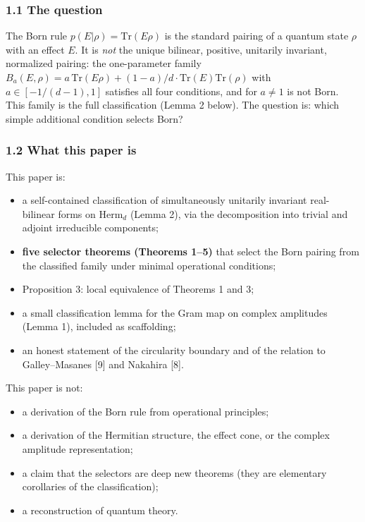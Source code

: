 \documentclass[
]{article}
\providecommand{\tightlist}{%
  \setlength{\itemsep}{0pt}\setlength{\parskip}{0pt}}
\begin{document}
\subsubsection{1.1 The question}\label{the-question}

The Born rule \(p(E|\rho)=\mathrm{Tr}(E\rho)\) is the standard pairing
of a quantum state \(\rho\) with an effect \(E\). It is \emph{not} the
unique bilinear, positive, unitarily invariant, normalized pairing: the
one-parameter family
\(B_a(E,\rho)=a\,\mathrm{Tr}(E\rho)+(1-a)/d\cdot\mathrm{Tr}(E)\mathrm{Tr}(\rho)\)
with \(a\in[-1/(d-1),1]\) satisfies all four conditions, and for
\(a\neq 1\) is not Born. This family is the full classification (Lemma 2
below). The question is: which simple additional condition selects Born?

\subsubsection{1.2 What this paper is}\label{what-this-paper-is}

This paper is:

\begin{itemize}
\tightlist
\item
  a self-contained classification of simultaneously unitarily invariant
  real-bilinear forms on \(\mathrm{Herm}_d\) (Lemma 2), via the
  decomposition into trivial and adjoint irreducible components;
\item
  \textbf{five selector theorems (Theorems 1--5)} that select the Born
  pairing from the classified family under minimal operational
  conditions;
\item
  Proposition 3: local equivalence of Theorems 1 and 3;
\item
  a small classification lemma for the Gram map on complex amplitudes
  (Lemma 1), included as scaffolding;
\item
  an honest statement of the circularity boundary and of the relation to
  Galley--Masanes {[}9{]} and Nakahira {[}8{]}.
\end{itemize}

This paper is not:

\begin{itemize}
\tightlist
\item
  a derivation of the Born rule from operational principles;
\item
  a derivation of the Hermitian structure, the effect cone, or the
  complex amplitude representation;
\item
  a claim that the selectors are deep new theorems (they are elementary
  corollaries of the classification);
\item
  a reconstruction of quantum theory.
\end{itemize}
\end{document}
